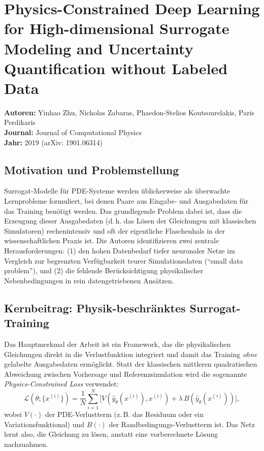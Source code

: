 \documentclass[a4paper,12pt]{article}
\begin{document}
\section*{Physics-Constrained Deep Learning for High-dimensional Surrogate Modeling
and Uncertainty Quantification without Labeled Data}

\textbf{Autoren:} Yinhao Zhu, Nicholas Zabaras, Phaedon-Stelios Koutsourelakis, Paris Perdikaris \\
\textbf{Journal:} Journal of Computational Physics \\
\textbf{Jahr:} 2019 (arXiv: 1901.06314)

\subsection*{Motivation und Problemstellung}

Surrogat-Modelle für PDE-Systeme werden üblicherweise als überwachte Lernprobleme formuliert,
bei denen Paare aus Eingabe- und Ausgabedaten für das Training benötigt werden.
Das grundlegende Problem dabei ist, dass die Erzeugung dieser Ausgabedaten (d.\,h. das
Lösen der Gleichungen mit klassischen Simulatoren) rechenintensiv und oft der eigentliche
Flaschenhals in der wissenschaftlichen Praxis ist. Die Autoren identifizieren zwei zentrale
Herausforderungen: (1) den hohen Datenbedarf tiefer neuronaler Netze im Vergleich zur
begrenzten Verfügbarkeit teurer Simulationsdaten (``small data problem''), und (2) die
fehlende Berücksichtigung physikalischer Nebenbedingungen in rein datengetriebenen Ansätzen.

\subsection*{Kernbeitrag: Physik-beschränktes Surrogat-Training}

Das Hauptmerkmal der Arbeit ist ein Framework, das die physikalischen Gleichungen direkt
in die Verlustfunktion integriert und damit das Training \emph{ohne} gelabelte
Ausgabedaten ermöglicht. Statt der klassischen mittleren quadratischen Abweichung zwischen
Vorhersage und Referenzsimulation wird die sogenannte \emph{Physics-Constrained Loss} verwendet:
%
\begin{equation}
\mathcal{L}(\theta; \{x^{(i)}\}) = \frac{1}{N} \sum_{i=1}^{N} \bigl[ V(\hat{y}_\theta(x^{(i)}), x^{(i)}) + \lambda\, B(\hat{y}_\theta(x^{(i)})) \bigr],
\end{equation}
%
wobei $V(\cdot)$ der PDE-Verlustterm (z.\,B. das Residuum oder ein Variationsfunktional)
und $B(\cdot)$ der Randbedingungs-Verlustterm ist. Das Netz lernt also, die Gleichung
zu lösen, anstatt eine vorberechnete Lösung nachzuahmen.
\end{document}

